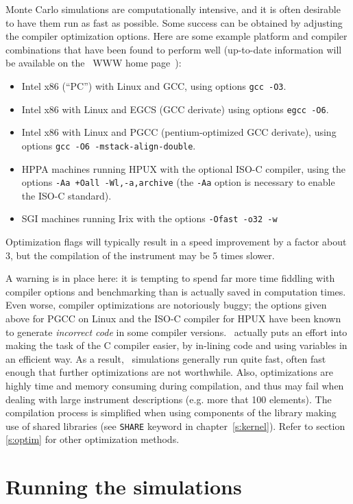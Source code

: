 Monte Carlo simulations are computationally intensive, and it is often desirable
to have them run as fast as possible. Some success can be obtained by adjusting
the compiler optimization options. Here are some example platform and compiler
combinations that have been found to perform well (up-to-date information will
be available on the \MCS\ WWW home page~\cite{mcstas_webpage}):
\begin{itemize}
\item Intel x86 (``PC'') with Linux and GCC, using options \verb+gcc -O3+.
\item Intel x86 with Linux and EGCS (GCC derivate) using
  options \verb+egcc -O6+.
\item Intel x86 with Linux and PGCC (pentium-optimized GCC derivate), using
  options \verb+gcc -O6 -mstack-align-double+.
\item HPPA machines running HPUX with the optional ISO-C compiler,
  using the options
  \verb|-Aa +Oall -Wl,-a,archive| (the \verb+-Aa+ option is necessary to
  enable the ISO-C standard).
\item SGI machines running Irix with the options
  \verb|-Ofast -o32 -w|
\end{itemize}
Optimization flags will typically result in a speed improvement by a factor
about 3, but the compilation of the instrument may be 5 times slower.

A warning is in place here: it is tempting to spend far more time fiddling with
compiler options and benchmarking than is actually saved in computation
times. Even worse, compiler optimizations are notoriously buggy; the options
given above for PGCC on Linux and the ISO-C compiler for HPUX have been known to
generate \emph{incorrect code} in some compiler versions. \MCS\ actually puts an
effort into making the task of the C compiler easier, by in-lining code and
using variables in an efficient way. As a result, \MCS\ simulations generally
run quite fast, often fast enough that further optimizations are not
worthwhile. Also, optimizations are highly time and memory consuming during
compilation, and thus may fail when dealing with large instrument descriptions
(e.g. more that 100 elements). The compilation process is simplified when using
components of the library making use of shared libraries (see \verb+SHARE+
keyword in chapter~\ref{s:kernel}). Refer to section \ref{s:optim} for other
optimization methods.

\section{Running the simulations}
\label{s:run-sim}

